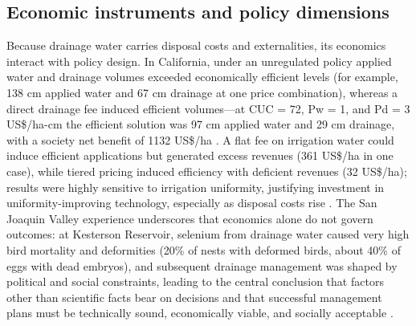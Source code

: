 \subsection{Economic instruments and policy dimensions}
Because drainage water carries disposal costs and externalities, its economics interact with policy design. In California, under an unregulated policy applied water and drainage volumes exceeded economically efficient levels (for example, 138 cm applied water and 67 cm drainage at one price combination), whereas a direct drainage fee induced efficient volumes---at CUC = 72, Pw = 1, and Pd = 3 US\$/ha-cm the efficient solution was 97 cm applied water and 29 cm drainage, with a society net benefit of 1132 US\$/ha \parencite{DINAR1989}. A flat fee on irrigation water could induce efficient applications but generated excess revenues (361 US\$/ha in one case), while tiered pricing induced efficiency with deficient revenues (32 US\$/ha); results were highly sensitive to irrigation uniformity, justifying investment in uniformity-improving technology, especially as disposal costs rise \parencite{DINAR1989}. The San Joaquin Valley experience underscores that economics alone do not govern outcomes: at Kesterson Reservoir, selenium from drainage water caused very high bird mortality and deformities (20\% of nests with deformed birds, about 40\% of eggs with dead embryos), and subsequent drainage management was shaped by political and social constraints, leading to the central conclusion that factors other than scientific facts bear on decisions and that successful management plans must be technically sound, economically viable, and socially acceptable \parencite{Letey1999}.

